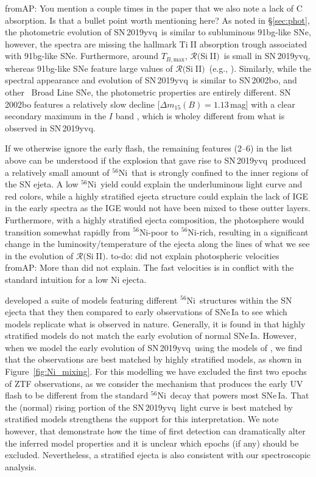 \documentclass[twocolumn]{aastex63}
\def\ion#1#2{#1$\;${\footnotesize\rm{#2}}\relax}
\newcommand{\fromabi}[1]{{\color{teal} fromAP: {#1}}}
\newcommand{\todo}[1]{{\color{magenta} to-do: {#1}}}
\newcommand{\tbmax}{$T_{B,\mathrm{max}}$}
\newcommand{\RSiII}{$\mathcal{R}($\ion{Si}{II}$)$}
\newcommand{\radni}{$^{56}$Ni}
\newcommand{\sn}{SN\,2019yvq}
\begin{document}
\fromabi{You mention a couple times in the paper that we also note a lack of C absorption. Is that a bullet point worth mentioning here?}
As noted in \S\ref{sec:phot}, the photometric evolution of \sn\ is similar to
subluminous 91bg-like SNe, however, the spectra are missing the hallmark
\ion{Ti}{II} absorption trough associated with 91bg-like SNe. Furthermore,
around \tbmax, \RSiII\ is small in \sn, whereas 91bg-like SNe feature large
values of \RSiII\ (e.g., \citealt{Branch09}). Similarly, while the spectral
appearance and evolution of \sn\ is similar to SN\,2002bo, and other
\citeauthor{Branch06}~Broad Line SNe, the photometric properties are entirely
different. SN\,2002bo features a relatively slow decline [$\Delta{m}_{15}(B) =
1.13$\,mag] with a clear secondary maximum in the $I$ band \citep{Benetti04},
which is wholey different from what is observed in \sn.

If we otherwise ignore the early flash, the remaining features (2--6) in the
list above can be understood if the explosion that gave rise to \sn\ produced
a relatively small amount of \radni\ that is strongly confined to the inner
regions of the SN ejeta. A low \radni\ yield could explain the underluminous
light curve and red colors, while a highly stratified ejecta structure could
explain the lack of IGE in the early spectra as the IGE would not have been
mixed to these outter layers. Furthermore, with a highly stratified ejecta
composition, the photosphere would transition somewhat rapidly from
\radni-poor to \radni-rich, resulting in a significant change in the
luminosity/temperature of the ejecta along the lines of what we see in the
evolution of \RSiII. \todo{did not explain photospheric velocities}\fromabi{More than did not explain. The fast velocities is in conflict with the standard intuition for a low Ni ejecta.}

\citet{Magee20} developed a suite of models featuring different \radni\
structures within the SN ejecta that they then compared to early observations
of SNe\,Ia to see which models replicate what is observed in nature.
Generally, it is found in \citet{Magee20} that highly stratified models do not
match the early evolution of normal SNe\,Ia. However, when we model the early
evolution of \sn\ using the models of \citet{Magee20}, we find that the
observations are best matched by highly stratified models, as shown in
Figure~\ref{fig:Ni_mixing}. For this modelling we have excluded the first two
epochs of ZTF observations, as we consider the mechanism that produces the
early UV flash to be different from the standard \radni\ decay that powers
most SNe\,Ia. That the (normal) rising portion of the \sn\ light curve is best
matched by stratified models strengthens the support for this interpretation. We note however, that \cite{Magee20} demonstrate how the time of first detection can dramatically alter the inferred model properties and it is unclear which epochs (if any) should be excluded. Nevertheless, a stratified ejecta is also consistent with our spectroscopic analysis.
\end{document}
